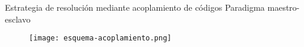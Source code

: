 





\begin{frame}
{Estrategia de resolución mediante acoplamiento de códigos}
{Paradigma maestro-esclavo}

\begin{figure}
\centering{}
\texttt{[image: esquema-acoplamiento.png]}
\end{figure}


\end{frame}


